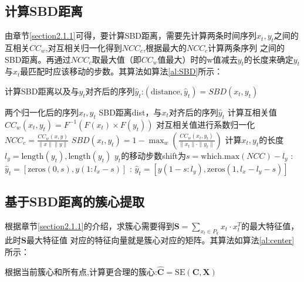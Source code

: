 \subsection{计算SBD距离}
由章节\ref{section2.1.1}可得，要计算SBD距离，需要先计算两条时间序列$x_t,y_t$之间的互相关$CC_w$,对互相关归一化得到$NCC_c$,根据最大的$NCC_c$计算两条序列
之间的SBD距离。再通过$NCC_c$取最大值（即$CC_w$值最大）时的w值减去$y_t$的长度来确定$y_t$与$x_t$最匹配时应该移动的步数。其算法如算法\ref{al:SBD}所示：
\begin{algorithm}[H]
    \caption{计算SBD距离以及与$y_t$对齐后的序列$\hat{y}_t$:$(\text{distance}, \hat{y}_t) = SBD(x_t, y_t)$}
    \begin{algorithmic}[1]
        \Require 两个归一化后的序列$x_t,y_t$
        \Ensure SBD距离dist，与$x_t$对齐后的序列$\hat{y}_t$
        \State 计算互相关值$CC_w(x_t, y_t) = F^{-1}(F(x_t) \times F(y_t))$%
        \State 对互相关值进行系数归一化$NCC_c = \frac{CC_w(x,y)}{\|x\|\|y\|}$
        \State $SBD(x_t, y_t) = 1 - \max_w \left( \frac{CC_w(x_t, y_t)}{\|x_t\| \cdot \|y_t\|} \right)$
        \State 计算$x_t,y_t$的长度$l_{y} = \text{length}(y_{t}),\text{length}(y_{t})$
        \State $y_t$的移动步数shift为$s = \text{which.max}(NCC) - l_y$
        :
            \State $\hat{y}_t = [\text{zeros}(0,s),y(1:l_x - s)]$
        \Else:
            \State $\hat{y}_t = [y(1 - s:l_y),\text{zeros}(1,l_x - l_y - s)]$
        \EndIf
    \end{algorithmic}
    \label{al:SBD}
\end{algorithm}  
\subsection{基于SBD距离的簇心提取}
根据章节\ref{section2.1.1}的介绍，求簇心需要得到$\mathbf{S} = \sum_{x_t \in P_k} x_t \cdot x_t^T$的最大特征值，此时$\mathbf{S}$最大特征值
对应的特征向量就是簇心对应的矩阵。其算法如算法\ref{al:center}所示：
\begin{algorithm}
    \caption{根据当前簇心和所有点,计算更合理的簇心:$\mathbf{\hat{C}} = \text{SE}(\mathbf{C},\mathbf{X})$}
\end{algorithm}